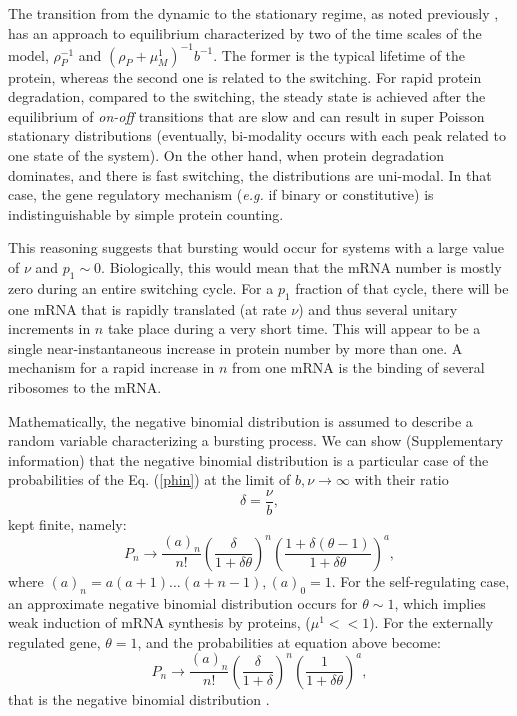 The transition from the dynamic to the stationary regime, as noted
previously \cite{innocentini07, ramos11}, has an approach to
equilibrium characterized by two of the time scales of the model,
$\rho_P^{-1}$ and $(\rho_P+\mu^1_M)^{-1}b^{-1}$.  The former is the
typical lifetime of the protein, whereas the second one is related to
the switching.  For rapid protein degradation, compared to the
switching, the steady state is achieved after the equilibrium of {\em
  on-off} transitions that are slow and can result in super Poisson
stationary distributions (eventually, bi-modality occurs with each
peak related to one state of the system).  On the other hand, when
protein degradation dominates, and there is fast switching, the
distributions are uni-modal. In that case, the gene regulatory
mechanism ({\em e.g.} if binary or constitutive) is indistinguishable
by simple protein counting.

This reasoning suggests that bursting would occur for systems with a
large value of $\nu$ and $p_1\sim0$.  Biologically, this would mean
that the mRNA number is mostly zero during an entire switching cycle.
For a $p_1$ fraction of that cycle, there will be one mRNA that is
rapidly translated (at rate $\nu$) and thus several unitary increments
in $n$ take place during a very short time.  This will appear to be a
single near-instantaneous increase in protein number by more than
one. A mechanism for a rapid increase in $n$ from one mRNA is the
binding of several ribosomes to the mRNA.

Mathematically, the negative binomial distribution is assumed to
describe a random variable characterizing a bursting process. We can
show (Supplementary information) that the negative binomial
distribution is a particular case of the probabilities of the
Eq. (\ref{phin}) at the limit of $b,\nu \rightarrow \infty$ with their
ratio
\begin{equation}\label{delta}
\delta=\frac{\nu}{b},
\end{equation} 
kept finite, namely:
\begin{equation}\label{negbin1}
P_n \rightarrow \frac{(a)_n}{n!}
\left( \frac{\delta}{1+\delta \theta} \right)^n
\left( \frac{1+\delta(\theta-1)}{1+\delta \theta} \right)^a,
\end{equation}
where $(a)_n=a (a+1) \dots (a+n-1), (a)_0=1$.  For the self-regulating
case, an approximate negative binomial distribution occurs for $\theta
\sim 1$, which implies weak induction of mRNA synthesis by proteins,
($\mu^1 << 1$).  For the externally regulated gene, $\theta=1$, and
the probabilities at equation above become:
\begin{equation}\label{negbin}
P_n \rightarrow \frac{(a)_n}{n!}
\left( \frac{\delta}{1+\delta } \right)^n
\left( \frac{1}{1+\delta \theta} \right)^a,
\end{equation}
that is the negative binomial distribution \cite{Shahrezaei2008}.

